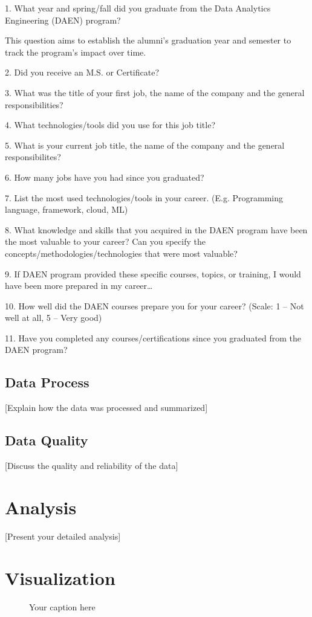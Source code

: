 \documentclass[12pt,a4paper]{article}
\begin{document}
1. What year and spring/fall did you graduate from the Data Analytics Engineering (DAEN) program? 

This question aims to establish the alumni's graduation year and semester to track the program's impact over time.

2. Did you receive an M.S. or Certificate?  

3. What was the title of your first job, the name of the company and the general responsibilities?

4. What technologies/tools did you use for this job title? 

5. What is your current job title, the name of the company and the general responsibilites?  

6. How many jobs have you had since you graduated? 

7. List the most used technologies/tools in your career. (E.g. Programming language, framework, cloud, ML) 

8. What knowledge and skills that you acquired in the DAEN program have been the most valuable to your career? Can you specify the concepts/methodologies/technologies that were most valuable? 

9. If DAEN program provided these specific courses, topics, or training, I would have been more prepared in my career… 

10. How well did the DAEN courses prepare you for your career? (Scale: 1 – Not well at all, 5 – Very good) 

11. Have you completed any courses/certifications since you graduated from the DAEN program? 

\subsection{Data Process}
[Explain how the data was processed and summarized]

\subsection{Data Quality}
[Discuss the quality and reliability of the data]

\section{Analysis}
[Present your detailed analysis]

\section{Visualization}
\begin{figure}[H]
    \centering
    \caption{Your caption here}
    \label{fig:your-label}
\end{figure}
\end{document}
